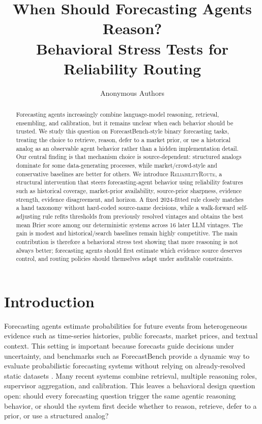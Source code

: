 \documentclass{article}
\title{When Should Forecasting Agents Reason?\\Behavioral Stress Tests for Reliability Routing}
\author{Anonymous Authors}
\newcommand{\rel}{\textsc{ReliabilityRoute}}
\begin{document}
\ifcolmsubmission
\linenumbers
\fi

\maketitle

\begin{abstract}
Forecasting agents increasingly combine language-model reasoning, retrieval, ensembling, and calibration, but it remains unclear when each behavior should be trusted. We study this question on ForecastBench-style binary forecasting tasks, treating the choice to retrieve, reason, defer to a market prior, or use a historical analog as an observable agent behavior rather than a hidden implementation detail. Our central finding is that mechanism choice is source-dependent: structured analogs dominate for some data-generating processes, while market/crowd-style and conservative baselines are better for others. We introduce \rel{}, a structural intervention that steers forecasting-agent behavior using reliability features such as historical coverage, market-prior availability, source-prior sharpness, evidence strength, evidence disagreement, and horizon. A fixed 2024-fitted rule closely matches a hand taxonomy without hard-coded source-name decisions, while a walk-forward self-adjusting rule refits thresholds from previously resolved vintages and obtains the best mean Brier score among our deterministic systems across 16 later LLM vintages. The gain is modest and historical/search baselines remain highly competitive. The main contribution is therefore a behavioral stress test showing that more reasoning is not always better; forecasting agents should first estimate which evidence source deserves control, and routing policies should themselves adapt under auditable constraints.
\end{abstract}

\section{Introduction}

Forecasting agents estimate probabilities for future events from heterogeneous evidence such as time-series histories, public forecasts, market prices, and textual context. This setting is important because forecasts guide decisions under uncertainty, and benchmarks such as ForecastBench provide a dynamic way to evaluate probabilistic forecasting systems without relying on already-resolved static datasets \citep{karger2024forecastbench}. Many recent systems combine retrieval, multiple reasoning roles, supervisor aggregation, and calibration. This leaves a behavioral design question open: should every forecasting question trigger the same agentic reasoning behavior, or should the system first decide whether to reason, retrieve, defer to a prior, or use a structured analog?
\end{document}
